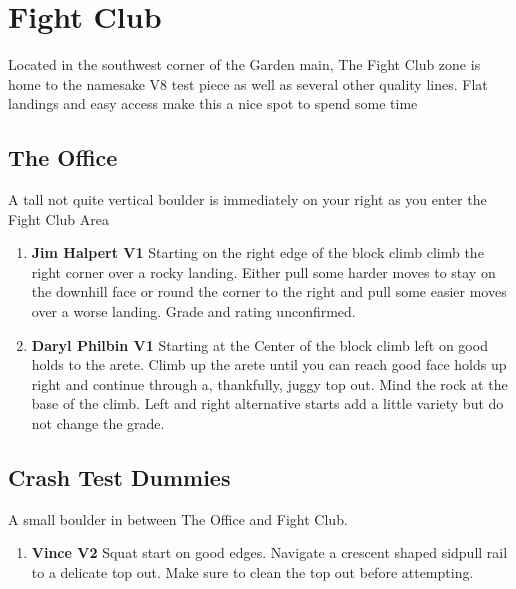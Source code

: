 \section{Fight Club}\label{sa:Fight Club}
Located in the southwest corner of the Garden main, The Fight Club zone is home to the namesake V8 test piece as well as several other quality lines. Flat landings and easy access make this a nice spot to spend some time

\subsection*{The Office}\label{bf:The Office}
A tall not quite vertical boulder is immediately on your right as you enter the Fight Club Area

\begin{enumerate}[]
	\item\label{rt:Jim Halpert} \colorbox{green!20}{\textbf{Jim Halpert V1  \warn \warn } }
	\newline Starting on the right edge of the block climb climb the right corner over a rocky landing. Either pull some harder moves to stay on the downhill face or round the corner to the right and pull some easier moves over a worse landing. Grade and rating unconfirmed.\
	\item\label{rt:Daryl Philbin} \colorbox{green!20}{\textbf{Daryl Philbin V1      \warn } }
	\newline Starting at the Center of the block climb left on good holds to the arete. Climb up the arete until you can reach good face holds up right and continue through a, thankfully, juggy top out. Mind the rock at the base of the climb. Left and right alternative starts add a little variety but do not change the grade.\
\end{enumerate}
\subsection*{Crash Test Dummies}\label{bf:Crash Test Dummies}
A small boulder in between The Office and Fight Club.

\begin{enumerate}[resume]
	\item\label{rt:Vince} \colorbox{green!20}{\textbf{Vince V2     } }
	\newline Squat start on good edges. Navigate a crescent shaped sidpull rail to a delicate top out. Make sure to clean the top out before attempting.\
\end{enumerate}
